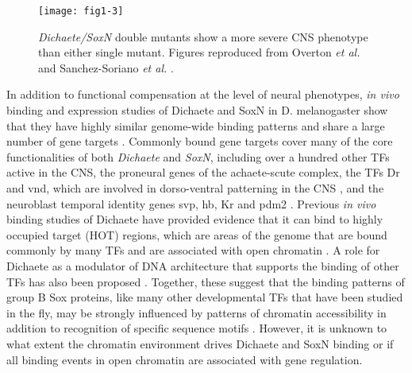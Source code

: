 \begin{figure}
\centering
\texttt{[image: fig1-3]}
\caption{\emph{Dichaete/SoxN} double mutants show a more severe CNS phenotype than either single mutant. Figures reproduced from Overton \emph{et al.} \citet{overton_evidence_2002} and Sanchez-Soriano \emph{et al.} \citet{soriano_drosophila_1998}.}
\label{Figure 1.3}
\end{figure}

In addition to functional compensation at the level of neural phenotypes, \emph{in vivo} binding and expression studies of Dichaete and SoxN in D. melanogaster show that they have highly similar genome-wide binding patterns and share a large number of gene targets \citep{aleksic_role_2013,ferrero_soxneuro_2014}. Commonly bound gene targets cover many of the core functionalities of both \emph{Dichaete} and \emph{SoxN}, including over a hundred other TFs active in the CNS, the proneural genes of the achaete-scute complex, the TFs Dr and vnd, which are involved in dorso-ventral patterning in the CNS \citep{zhao_genetic_2007}, and the neuroblast temporal identity genes svp, hb, Kr and pdm2 \citep{ferrero_soxneuro_2014,isshiki_drosophila_2001,maurange_brainy_2005}. Previous \emph{in vivo} binding studies of Dichaete have provided evidence that it can bind to highly occupied target (HOT) regions, which are areas of the genome that are bound commonly by many TFs and are associated with open chromatin \citep{aleksic_role_2013,kvon_hot_2012}. A role for Dichaete as a modulator of DNA architecture that supports the binding of other TFs has also been proposed \citep{russell_dichaete_1996}. Together, these suggest that the binding patterns of group B Sox proteins, like many other developmental TFs that have been studied in the fly, may be strongly influenced by patterns of chromatin accessibility in addition to recognition of specific sequence motifs \citep{ferrero_soxneuro_2014,macarthur_developmental_2009}. However, it is unknown to what extent the chromatin environment drives Dichaete and SoxN binding or if all binding events in open chromatin are associated with gene regulation.\\

